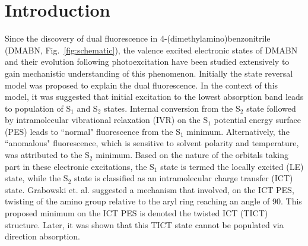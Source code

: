 \documentclass[journal=jacsat,manuscript=article]{achemso}
\begin{document}
\section{Introduction}
Since the discovery of dual fluorescence in 4-(dimethylamino)benzonitrile (DMABN, Fig.~\ref{fig:schematic}),\cite{lippert1961umwandlung} the valence excited electronic states of DMABN and their evolution following photoexcitation have been studied extensively to gain mechanistic understanding of this phenomenon.\cite{modesto2018discrete,kochman2020simulating,curchod2017ab,sobolewski1998ab,parusel1999coupled,rappoport2004photoinduced,kohn2004,gomez2021micro} Initially the state reversal model was proposed to explain the dual fluorescence.\cite{lippert1962advances} In the context of this model, it was suggested that initial excitation to the lowest absorption band leads to population of S$_1$ and S$_2$ states. Internal conversion from the S$_2$ state followed by intramolecular vibrational relaxation (IVR) on the S$_1$ potential energy surface (PES) leads to ``normal" fluorescence from the S$_1$ minimum. Alternatively, the ``anomalous" fluorescence, which is sensitive to solvent polarity and temperature, was attributed to the S$_2$ minimum. Based on the nature of the orbitals taking part in these electronic excitations, the S$_1$ state is termed the locally excited (LE) state, while the S$_2$ state is classified as an intramolecular charge transfer (ICT) state. Grabowski et. al. suggested a mechanism that involved, on the ICT PES, twisting of the amino group relative to the aryl ring reaching an angle of 90\degree.\cite{rotkiewicz1973reinterpretation,grabowski1979twisted} This proposed minimum on the ICT PES is denoted the twisted ICT (TICT) structure. Later, it was shown that this TICT state cannot be populated via direction absorption.\cite{leinhos1991intramolecular}
\end{document}
